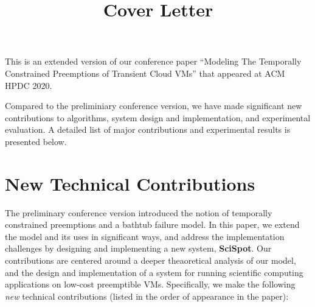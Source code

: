 \documentclass{article}
\title{Cover Letter}
\date{}
\begin{document}
\maketitle

This is an extended version of our conference paper ``Modeling The Temporally Constrained Preemptions of Transient Cloud VMs'' that appeared at ACM HPDC 2020. 

Compared to the preliminiary conference version, we have made significant new contributions to algorithms, system design and implementation, and experimental evaluation. A detailed list of major contributions and experimental results is presented below. 



\section{New Technical Contributions}

The preliminary conference version introduced the notion of temporally constrained preemptions and a bathtub failure model.
In this paper, we extend the model and its uses in significant ways, and address the implementation challenges by designing and implementing a new system, \textbf{SciSpot}. 
Our contributions are centered around a deeper theaoretical analysis of our model, and the design and implementation of a system for running scientific computing applications on low-cost preemptible VMs. 
Specifically, we make the following \emph{new} technical contributions (listed in the order of appearance in the paper): 
\end{document}
